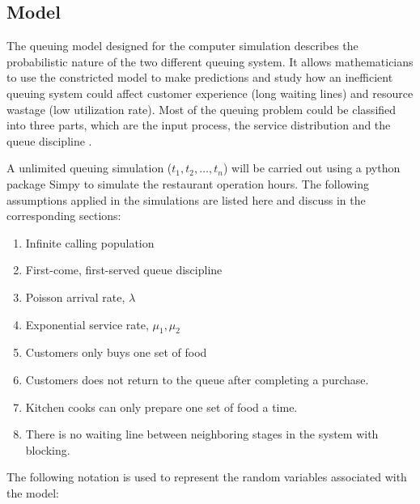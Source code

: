 \subsection{Model}
The queuing model designed for the computer simulation describes the probabilistic nature of the two different queuing system. It allows mathematicians to use the constricted model to make predictions and study how an inefficient queuing system could affect customer experience (long waiting lines) and resource wastage (low utilization rate).
Most of the queuing problem could be classified into three parts, which are the input process, the service distribution and the queue discipline \cite{PINSKY2011447}.

A unlimited queuing simulation ($t_1,t_2,\dots,t_n$) will be carried out using a python package Simpy \cite{grayson} to simulate the restaurant operation hours.
The following assumptions applied in the simulations are listed here and discuss in the corresponding sections:
\begin{enumerate}[label=\alph*)]
    \item Infinite calling population
    \item First-come, first-served queue discipline
    \item Poisson arrival rate, $\lambda$
    \item Exponential service rate, $\mu_1,\mu_2$
    \item Customers only buys one set of food
    \item Customers does not return to the queue after completing a purchase.
    \item Kitchen cooks can only prepare one set of food a time.
    \item There is no waiting line between neighboring stages in the system with blocking.
\end{enumerate}
The following notation is used to represent the random variables associated with the model:
